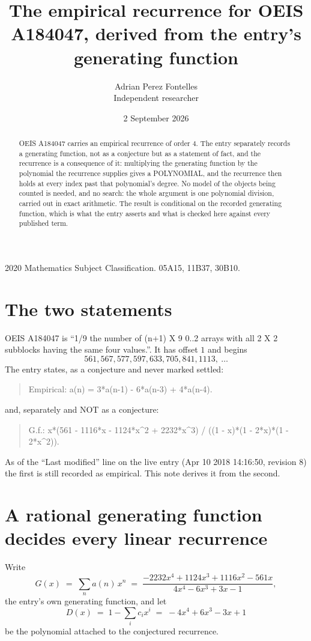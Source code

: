 \documentclass[11pt,a4paper]{article}
\title{The empirical recurrence for OEIS A184047, derived from the entry's generating function}
\author{Adrian Perez Fontelles\\ \small Independent researcher}
\date{2 September 2026}
\theoremstyle{plain}
\theoremstyle{definition}
\begin{document}
\maketitle

\begin{abstract}
OEIS A184047 carries an empirical recurrence of order $4$. The entry separately records a
generating function, not as a conjecture but as a statement of fact, and the recurrence is a
consequence of it: multiplying the generating function by the polynomial the recurrence
supplies gives a POLYNOMIAL, and the recurrence then holds at every index past that
polynomial's degree. No model of the objects being counted is needed, and no search: the
whole argument is one polynomial division, carried out in exact arithmetic. The result is
conditional on the recorded generating function, which is what the entry asserts and what is
checked here against every published term.
\end{abstract}

\noindent\small 2020 Mathematics Subject Classification. 05A15, 11B37, 30B10.\normalsize

\section{The two statements}

OEIS A184047 is ``1/9 the number of (n+1) X 9 0..2 arrays with all 2 X 2 subblocks having the same four values.''. It has offset $1$ and begins
\[
561, 567, 577, 597, 633, 705, 841, 1113,\ \dots
\]
The entry states, as a conjecture and never marked settled:
\begin{quote}
Empirical: a(n) = 3*a(n-1) - 6*a(n-3) + 4*a(n-4).
\end{quote}
and, separately and NOT as a conjecture:
\begin{quote}
G.f.: x*(561 - 1116*x - 1124*x\^{}2 + 2232*x\^{}3) / ((1 - x)*(1 - 2*x)*(1 - 2*x\^{}2)).
\end{quote}
As of the ``Last modified'' line on the live entry (Apr 10 2018 14:16:50, revision 8) the first is still
recorded as empirical. This note derives it from the second.

\section{A rational generating function decides every linear recurrence}

Write
\[
G(x)\;=\;\sum_{n}a(n)\,x^{n}\;=\;\frac{- 2232 x^{4} + 1124 x^{3} + 1116 x^{2} - 561 x}{4 x^{4} - 6 x^{3} + 3 x - 1},
\]
the entry's own generating function, and let
\[
D(x)\;=\;1-\sum_i c_i x^{i}\;=\;- 4 x^{4} + 6 x^{3} - 3 x + 1
\]
be the polynomial attached to the conjectured recurrence.
\end{document}
